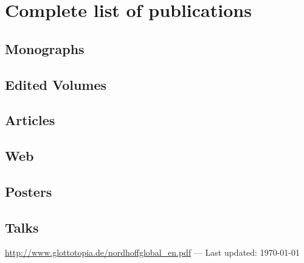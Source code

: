 \documentclass[a4paper,10pt]{book}
\author{Sebastian Nordhoff}
\begin{document}
\chapter*{Complete list of publications}
\section{Monographs}
\noindent


\section{Edited Volumes}
\noindent


\section{Articles}
\noindent


\section{Web}
\noindent

 
\section{Posters}


\section{Talks}
\noindent


\begin{center}
{\footnotesize \href{http://www.glottotopia.de/nordhoffglobal\_en.pdf}{http://www.glottotopia.de/nordhoffglobal\_en.pdf} — Last updated: \today
}
\end{center}
\end{document}
